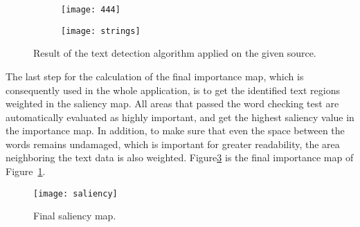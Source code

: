 \documentclass[draft,final]{vutinfth} %
\begin{document}
	\begin{figure}
		\centering
		\begin{subfigure}[b]{0.45\columnwidth}
			\centering
			\texttt{[image: 444]}
			\label{fig:strings:org}
		\end{subfigure}
		\begin{subfigure}[b]{0.45\columnwidth}
			\centering
			\texttt{[image: strings]}
		\end{subfigure}
		\caption{Result of the text detection algorithm applied on the given source.}
		\label{fig:strings} %
	\end{figure}
	The last step for the calculation of the final importance map, which is consequently used in the whole application, is to get the identified text regions weighted in the saliency map. 
	All areas that passed the word checking test are automatically evaluated as highly important, and get the highest saliency value in the importance map.
	In addition, to make sure that even the space between the words remains undamaged, which is important for greater readability, the area neighboring the text data is also weighted.
	Figure\ref{fig:saliency} is the final importance map of Figure~\ref{fig:strings:org}.
	\begin{figure}[h]
		\centering		
		\texttt{[image: saliency]}
		\caption{Final saliency map.}
		\label{fig:saliency}
	\end{figure}
	
\end{document}

